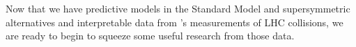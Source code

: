 Now that we have predictive models in the Standard Model and supersymmetric
alternatives
and interpretable data from \atlas's measurements of LHC collisions,
we are ready to begin to squeeze some useful research from those data.


